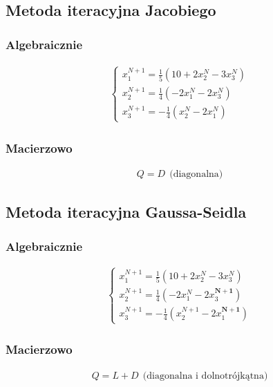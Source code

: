\documentclass[main.tex]{subfiles}
\begin{document}
    \subsection{Metoda iteracyjna Jacobiego}

    \subsubsection{Algebraicznie}
    \begin{align*}
        \left\{\begin{matrix}
                   x^{N+1}_1 = \frac{1}{5}(10 + 2x^N_2 - 3x^N_3)\\
                   x^{N+1}_2 = \frac{1}{4}(-2x^N_1 - 2x^N_3)\\
                   x^{N+1}_3 = -\frac{1}{4}(x^N_2 - 2x^N_1)
        \end{matrix}\right.
    \end{align*}

    \subsubsection{Macierzowo}
    \begin{align*}
        Q = D ~~ \text{(diagonalna)}
    \end{align*}

    \subsection{Metoda iteracyjna Gaussa-Seidla}
    \subsubsection{Algebraicznie}
    \begin{align*}
        \left\{\begin{matrix}
                   x^{N+1}_1 = \frac{1}{5}(10 + 2x^N_2 - 3x^N_3)\\
                   x^{N+1}_2 = \frac{1}{4}(-2x^N_1 - 2x^{\mathbf{N+1}}_3)\\
                   x^{N+1}_3 = -\frac{1}{4}(x^{N+1}_2 - 2x^{\mathbf{N+1}}_1)
        \end{matrix}\right.
    \end{align*}

    \subsubsection{Macierzowo}
    \begin{align*}
        Q = L + D ~~ \text{(diagonalna i dolnotrójkątna)}
    \end{align*}
\end{document}
